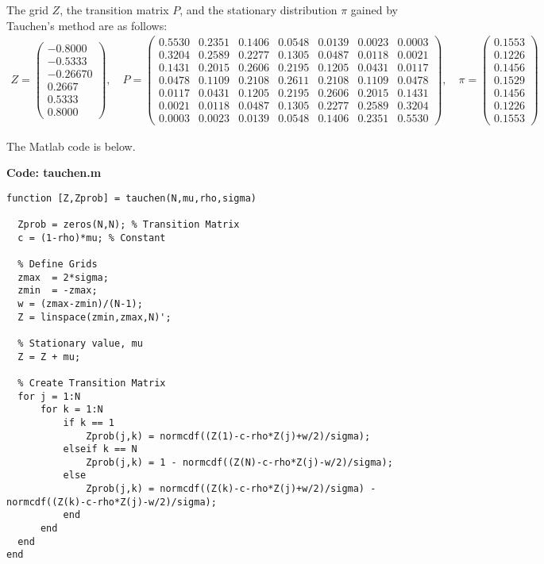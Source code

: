\documentclass{ltjsarticle}
\begin{document}
The grid $Z$, the transition matrix $P$, and the stationary distribution $\pi$ gained by Tauchen's method are as follows:
\begin{gather*}
    Z = \begin{pmatrix}
        -0.8000\\
        -0.5333\\
        -0.2667
              0\\
        0.2667\\
        0.5333\\
        0.8000
    \end{pmatrix}
    , \quad
    P = \begin{pmatrix}
        0.5530 & 0.2351 & 0.1406 & 0.0548 & 0.0139 & 0.0023 & 0.0003\\
        0.3204 & 0.2589 & 0.2277 & 0.1305 & 0.0487 & 0.0118 & 0.0021\\
        0.1431 & 0.2015 & 0.2606 & 0.2195 & 0.1205 & 0.0431 & 0.0117\\
        0.0478 & 0.1109 & 0.2108 & 0.2611 & 0.2108 & 0.1109 & 0.0478\\
        0.0117 & 0.0431 & 0.1205 & 0.2195 & 0.2606 & 0.2015 & 0.1431\\
        0.0021 & 0.0118 & 0.0487 & 0.1305 & 0.2277 & 0.2589 & 0.3204\\
        0.0003 & 0.0023 & 0.0139 & 0.0548 & 0.1406 & 0.2351 & 0.5530
    \end{pmatrix}
    , \quad
    \pi = \begin{pmatrix}
        0.1553\\
        0.1226\\
        0.1456\\
        0.1529\\
        0.1456\\
        0.1226\\
        0.1553
    \end{pmatrix}
\end{gather*}

The Matlab code is below.

\noindent\textbf{Code: tauchen.m}
\lstset{style=matlab}
\begin{lstlisting}
function [Z,Zprob] = tauchen(N,mu,rho,sigma)

  Zprob = zeros(N,N); % Transition Matrix
  c = (1-rho)*mu; % Constant

  % Define Grids 
  zmax  = 2*sigma;
  zmin  = -zmax;
  w = (zmax-zmin)/(N-1);
  Z = linspace(zmin,zmax,N)';

  % Stationary value, mu
  Z = Z + mu;

  % Create Transition Matrix
  for j = 1:N
      for k = 1:N
          if k == 1
              Zprob(j,k) = normcdf((Z(1)-c-rho*Z(j)+w/2)/sigma);
          elseif k == N
              Zprob(j,k) = 1 - normcdf((Z(N)-c-rho*Z(j)-w/2)/sigma);
          else
              Zprob(j,k) = normcdf((Z(k)-c-rho*Z(j)+w/2)/sigma) - normcdf((Z(k)-c-rho*Z(j)-w/2)/sigma);
          end
      end
  end
end
\end{lstlisting}
\end{document}
